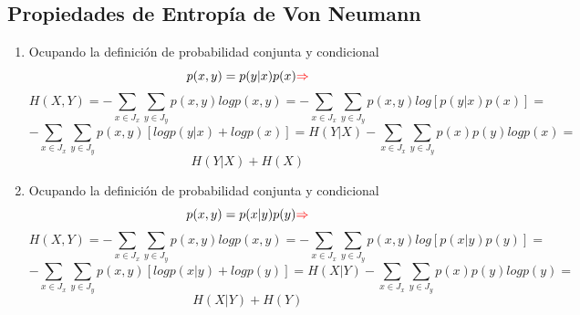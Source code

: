 \documentclass{book}
\begin{document}
\subsection{Propiedades de Entropía de Von Neumann}
\begin{enumerate}
\item Ocupando la definición de probabilidad conjunta y condicional $$p(x,y)=p(y|x)p(x)\textcolor{red}{\Rightarrow}$$ $$H(X,Y)=-\sum_{x\in J_x}\sum_{y\in J_y}p(x,y)log p(x,y)=-\sum_{x\in J_x}\sum_{y\in J_y}p(x,y)log [p(y|x)p(x)]=$$ $$-\sum_{x\in J_x}\sum_{y\in J_y}p(x,y)[log p(y|x)+log p(x)]=H(Y|X)-\sum_{x\in J_x}\sum_{y\in J_y}p(x)p(y)log p(x)=$$ $$ H(Y|X)+H(X) $$
\item 
Ocupando la definición de probabilidad conjunta y condicional $$p(x,y)=p(x|y)p(y)\textcolor{red}{\Rightarrow}$$ $$H(X,Y)=-\sum_{x\in J_x}\sum_{y\in J_y}p(x,y)log p(x,y)=-\sum_{x\in J_x}\sum_{y\in J_y}p(x,y)log[ p(x|y)p(y)]=$$ $$-\sum_{x\in J_x}\sum_{y\in J_y}p(x,y)[log p(x|y)+log p(y)]=H(X|Y)-\sum_{x\in J_x}\sum_{y\in J_y}p(x)p(y)log p(y)=$$ $$ H(X|Y)+H(Y) $$
\end{enumerate}
\end{document}
